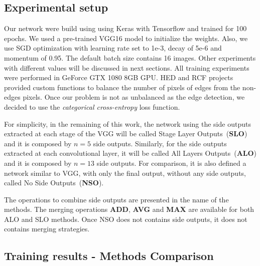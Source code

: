 \subsection{Experimental setup}
   
Our network were build using using Keras \cite{chollet2015keras} with Tensorflow \cite{tensorflow2015-whitepaper} and trained for 100 epochs. We used a pre-trained VGG16 model to initialize the weights. Also, we use SGD optimization with learning rate set to 1e-3, decay of 5e-6 and momentum of 0.95. The default batch size contains 16 images. Other experiments with different values will be discussed in next sections. All training experiments were performed in GeForce GTX 1080 8GB GPU. HED and RCF projects provided custom functions to balance the number of pixels of edges from the non-edges pixels. Once our problem is not as unbalanced as the edge detection, we decided to use the  \textit{{categorical} {cross-entropy}} loss function.

For simplicity, in the remaining of this work, the network using the side outputs extracted at each stage of the VGG will be called Stage Layer Outputs~(\textbf{SLO}) and it is composed by $n=5$ side outputs. Similarly, for the side outputs extracted at each convolutional layer, it will be called All Layers Outputs~(\textbf{ALO}) and it is composed by $n=13$ side outputs. For comparison, it is also defined a network similar to VGG, with only the final output, without any side outputs, called No Side Outputs~(\textbf{NSO}).

The operations to combine side outputs are presented in the name of the methods. The merging operations \textbf{ADD}, \textbf{AVG} and \textbf{MAX} are available for both ALO and SLO methods. Once NSO does not contains side outputs, it does not contains merging strategies.

\subsection{Training results - Methods Comparison}

